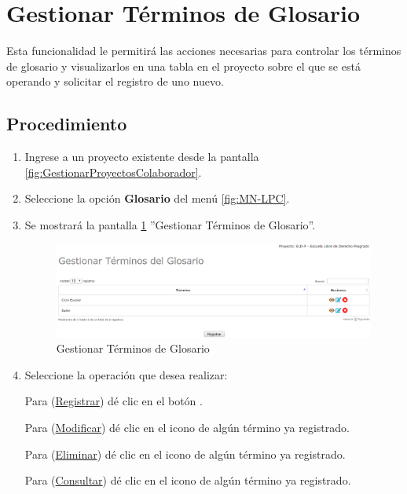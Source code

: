 \hypertarget{cv:GestionarGlosario}{\section{Gestionar Términos de Glosario}} \label{sec:GestionarGlosario}

	Esta funcionalidad le permitirá las acciones necesarias para controlar los términos de glosario y visualizarlos en una tabla en el proyecto sobre el que se está operando y solicitar el registro de uno nuevo.

		\subsection{Procedimiento}

			\begin{enumerate}
				
			\item Ingrese a un proyecto existente desde la pantalla \ref{fig:GestionarProyectosColaborador}.
	
			\item Seleccione la opción \textbf{Glosario} del menú \ref{fig:MN-LPC}.
	
			\item Se mostrará la pantalla \ref{fig:GestionarGlosario} ''Gestionar Términos de Glosario''.

			\begin{figure}[H]
				\begin{center}
					\includegraphics[scale=0.5]{roles/lider/glosario/pantallas/IU6gestionarGlosario}
					\caption{Gestionar Términos de Glosario}
					\label{fig:GestionarGlosario}
				\end{center}
			\end{figure}
		
				\item Seleccione la operación que desea realizar:
			
			Para (\hyperlink{cv:registrarTermino}{Registrar}) dé clic en el botón \IURegistrar.
			
			Para (\hyperlink{cv:modificarTermino}{Modificar}) dé clic en el icono \IUEditar{} de algún término ya registrado.
			
			Para (\hyperlink{cv:eliminarProyecto}{Eliminar}) dé clic en el icono \IUBotonEliminar{} de algún término ya registrado.
			
			Para (\hyperlink{cv:consultarTermino}{Consultar}) dé clic en el icono \IUConsultar{} de algún término ya registrado.
			\end{enumerate}